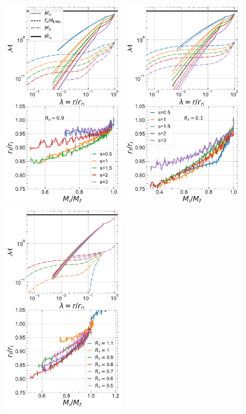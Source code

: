 \begin{figure}[htbp]
\centering
\includegraphics[height=9cm,trim={0 0 0.2cm 0},clip]{plots/relx_reln_shocked_vary-s.pdf}
\includegraphics[height=9cm,trim={2.2cm 0cm 0.2cm 0},clip]{plots/relx_reln_cold_vary-s.pdf}
\includegraphics[height=9cm,trim={2.2cm 0 0.2cm 0},clip]{plots/relx_reln_shocked_vary-lamshsp.pdf}

\end{figure}

